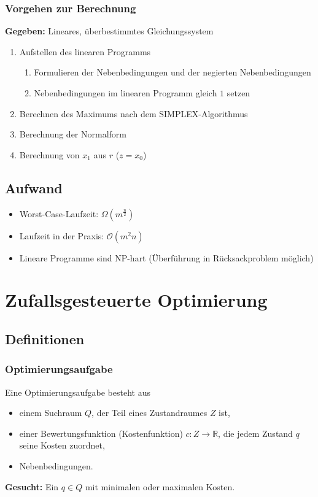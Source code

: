 \subsubsection{Vorgehen zur Berechnung}
\textbf{Gegeben:} Lineares, überbestimmtes Gleichungssystem
\begin{enumerate}
	\item Aufstellen des linearen Programms
	\begin{enumerate}
		\item Formulieren der Nebenbedingungen und der negierten Nebenbedingungen
		\item Nebenbedingungen im linearen Programm gleich \(1\) setzen
	\end{enumerate}
	\item Berechnen des Maximums nach dem SIMPLEX-Algorithmus
	\item Berechnung der Normalform
	\item Berechnung von \(x_1\) aus \(r\) (\(z = x_0\))
\end{enumerate}


\subsection{Aufwand}
\begin{itemize}
	\item Worst-Case-Laufzeit: \(\Omega(m^{\frac{n}{2}})\)
	\item Laufzeit in der Praxis: \(\mathcal{O}(m^2n)\)
	\item Lineare Programme sind NP-hart (Überführung in Rücksackproblem möglich)
\end{itemize}



\section{Zufallsgesteuerte Optimierung}

\subsection{Definitionen}

\subsubsection{Optimierungsaufgabe}
Eine Optimierungsaufgabe besteht aus
\begin{itemize}
	\item einem Suchraum \(Q\), der Teil eines Zustandraumes \(Z\) ist,
	\item einer Bewertungsfunktion (Kostenfunktion) \(c:Z \rightarrow \mathbb{R}\), die jedem Zustand \(q\) seine Kosten zuordnet,
	\item Nebenbedingungen.
\end{itemize}
\textbf{Gesucht:} Ein \(q \in Q\) mit minimalen oder maximalen Kosten.


